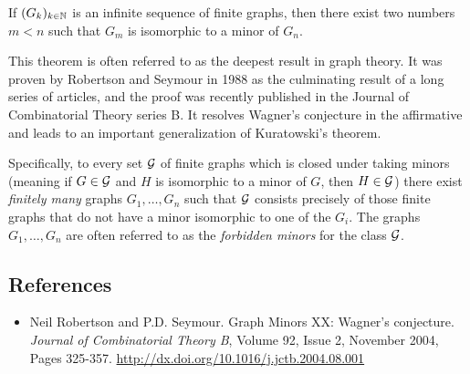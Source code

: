 \documentclass[12pt]{article}
\begin{document}


If $(G_k)_{k\in\Bbb{N}}$ is an infinite sequence of finite graphs, then there exist two numbers $m<n$ such that $G_m$ is isomorphic to a minor of $G_n$.

This theorem is often referred to as the deepest result in graph theory. It was proven by Robertson and Seymour in 1988 as the culminating result of a long series of articles, and the proof was recently published in the Journal of Combinatorial Theory series B. It resolves Wagner's conjecture in the affirmative and leads to an important generalization of Kuratowski's theorem.

Specifically, to every set $\cal{G}$ of finite graphs which is closed under taking minors (meaning if $G\in\cal{G}$ and $H$ is isomorphic to a minor of $G$, then $H\in\cal{G}$) there exist \emph{finitely many} graphs $G_1,\ldots,G_n$ such that $\cal{G}$ consists precisely of those finite graphs that do not have a minor isomorphic to one of the $G_i$. The graphs $G_1,\ldots,G_n$ are often referred to as the \emph{forbidden minors} for the class $\cal{G}$. 

\subsection{References}
\begin{itemize}
\item Neil Robertson and P.D. Seymour. Graph Minors XX: Wagner's conjecture. {\em Journal of Combinatorial Theory B}, Volume 92, Issue 2, November 2004, Pages 325-357. \url{http://dx.doi.org/10.1016/j.jctb.2004.08.001}
\end{itemize}
\end{document}
